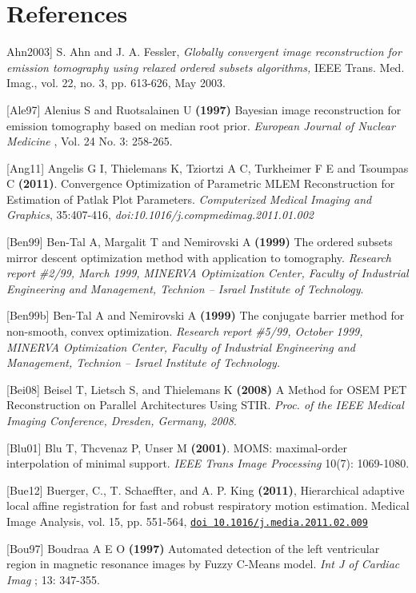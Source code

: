 \documentclass{article}
\def\url#1#2{\mbox{\href{#1}{\tt #2}}}
\newcommand{\tab}{\hspace{5mm}}
\begin{document}
{{{{{{\section{
References}

\tab {[}Ahn2003] S. Ahn and J. A. Fessler, \textit{Globally convergent image reconstruction for
emission tomography using relaxed ordered subsets algorithms,} IEEE
Trans. Med. Imag., vol. 22, no. 3, pp. 613-626, May 2003.

{[}Ale97] Alenius S and Ruotsalainen U \textbf{(1997)} Bayesian image 
reconstruction for emission tomography based on median root prior. \textit{European 
Journal of Nuclear Medicine} , Vol. 24 No. 3: 258-265.

{[}Ang11] Angelis G I, Thielemans K, Tziortzi A C, Turkheimer F E and Tsoumpas C  
\textbf{(2011)}. Convergence Optimization of Parametric MLEM Reconstruction for Estimation of Patlak Plot Parameters.  
\textit{Computerized Medical Imaging and Graphics}, 35:407-416,  
\textit{doi:10.1016/j.compmedimag.2011.01.002}

{[}Ben99] Ben-Tal A, Margalit T and Nemirovski A \textbf{(1999)} The 
ordered subsets mirror descent optimization method with application 
to tomography. \textit{Research report \#2/99, March 1999, MINERVA 
Optimization Center, Faculty of Industrial Engineering and Management, 
Technion -- Israel Institute of Technology}.

{[}Ben99b] Ben-Tal A and Nemirovski A \textbf{(1999)} The conjugate 
barrier method for non-smooth, convex optimization. \textit{Research 
report \#5/99, October 1999, MINERVA Optimization Center, Faculty 
of Industrial Engineering and Management, Technion -- Israel Institute 
of Technology.}

[Bei08] Beisel T, Lietsch S, and Thielemans K \textbf{(2008)}
A Method for OSEM PET Reconstruction on Parallel Architectures Using STIR.
\textit{Proc. of the IEEE Medical Imaging Conference, Dresden, Germany, 2008}.

{[}Blu01] Blu T, Thcvenaz P, Unser M \textbf{(2001)}. MOMS: maximal-order interpolation of minimal support.  \textit{IEEE Trans Image Processing} 10(7): 1069-1080.

[Bue12] Buerger, C., T. Schaeffter, and A. P. King \textbf{(2011)}, Hierarchical adaptive
local affine registration for fast and robust respiratory motion estimation.
Medical Image Analysis, vol. 15, pp. 551-564, 
\url{http://dx.doi.org/10.1016/j.media.2011.02.009}{doi 10.1016/j.media.2011.02.009} 

{[}Bou97] Boudraa \textsc{A E O} \textbf{(1997)} Automated detection of the 
left ventricular region in magnetic resonance images by Fuzzy 
C-Means model. \textit{Int J of Cardiac Imag} ; 13: 347-355.

}}}}}}
\end{document}
